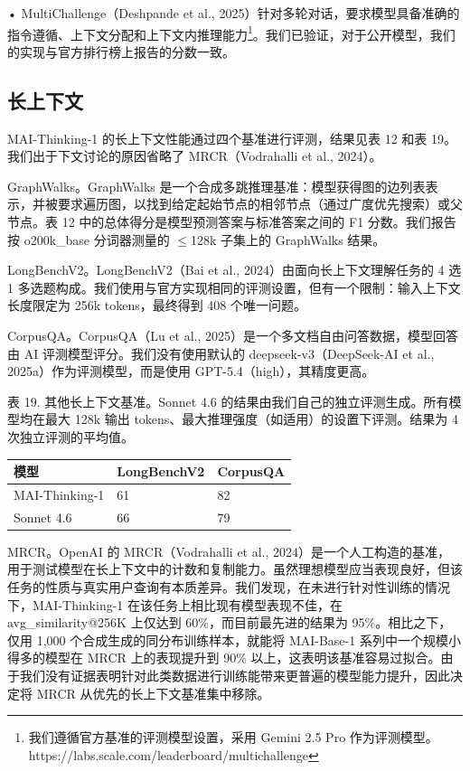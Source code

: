 \documentclass[
  10
]{article}
\newcounter{none} %
\begin{document}
• MultiChallenge（Deshpande et al., 2025）针对多轮对话，要求模型具备准确的指令遵循、上下文分配和上下文内推理能力\footnote{我们遵循官方基准的评测模型设置，采用 Gemini 2.5 Pro 作为评测模型。https://labs.scale.com/leaderboard/multichallenge}。我们已验证，对于公开模型，我们的实现与官方排行榜上报告的分数一致。

\subsection{长上下文}\label{k.3-long-context}

MAI-Thinking-1 的长上下文性能通过四个基准进行评测，结果见表 12 和表 19。我们出于下文讨论的原因省略了 MRCR（Vodrahalli et al., 2024）。

GraphWalks。GraphWalks 是一个合成多跳推理基准：模型获得图的边列表表示，并被要求遍历图，以找到给定起始节点的相邻节点（通过广度优先搜索）或父节点。表 12 中的总体得分是模型预测答案与标准答案之间的 F1 分数。我们报告按 o200k\_base 分词器测量的 $\leq$128k 子集上的 GraphWalks 结果。

LongBenchV2。LongBenchV2（Bai et al., 2024）由面向长上下文理解任务的 4 选 1 多选题构成。我们使用与官方实现相同的评测设置，但有一个限制：输入上下文长度限定为 256k tokens，最终得到 408 个唯一问题。

CorpusQA。CorpusQA（Lu et al., 2025）是一个多文档自由问答数据，模型回答由 AI 评测模型评分。我们没有使用默认的 deepseek-v3（DeepSeek-AI et al., 2025a）作为评测模型，而是使用 GPT-5.4（high），其精度更高。

表 19. 其他长上下文基准。Sonnet 4.6 的结果由我们自己的独立评测生成。所有模型均在最大 128k 输出 tokens、最大推理强度（如适用）的设置下评测。结果为 4 次独立评测的平均值。

{\def\LTcaptype{none} %
\begin{longtable}[]{@{}|l|l|l|@{}}
\toprule\noalign{}
\endhead
\bottomrule\noalign{}
\endlastfoot
\hline
模型 & LongBenchV2 & CorpusQA \\
\hline
MAI-Thinking-1 & 61 & 82 \\
\hline
Sonnet 4.6 & 66 & 79 \\
\hline
\end{longtable}
}

MRCR。OpenAI 的 MRCR（Vodrahalli et al., 2024）是一个人工构造的基准，用于测试模型在长上下文中的计数和复制能力。虽然理想模型应当表现良好，但该任务的性质与真实用户查询有本质差异。我们发现，在未进行针对性训练的情况下，MAI-Thinking-1 在该任务上相比现有模型表现不佳，在 avg\_similarity@256K 上仅达到 60\%，而目前最先进的结果为 95\%。相比之下，仅用 1,000 个合成生成的同分布训练样本，就能将 MAI-Base-1 系列中一个规模小得多的模型在 MRCR 上的表现提升到 90\% 以上，这表明该基准容易过拟合。由于我们没有证据表明针对此类数据进行训练能带来更普遍的模型能力提升，因此决定将 MRCR 从优先的长上下文基准集中移除。
\end{document}
